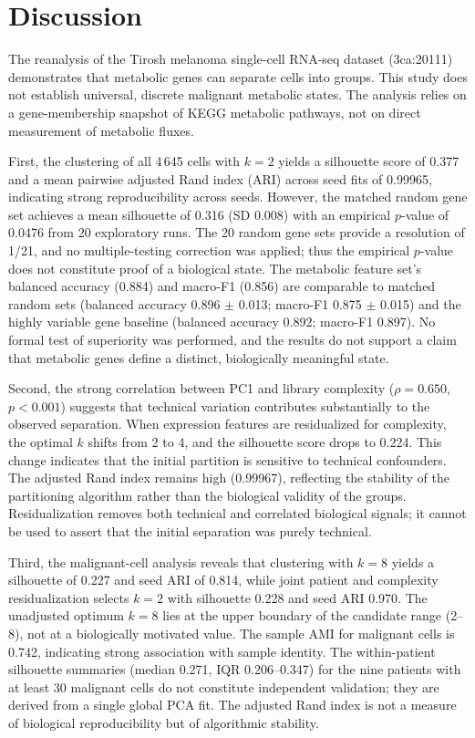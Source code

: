 \section{Discussion}

The reanalysis of the Tirosh melanoma single-cell RNA-seq dataset (3ca:20111) demonstrates that metabolic genes can separate cells into groups. This study does not establish universal, discrete malignant metabolic states. The analysis relies on a gene-membership snapshot of KEGG metabolic pathways, not on direct measurement of metabolic fluxes.

First, the clustering of all 4\,645 cells with $k=2$ yields a silhouette score of 0.377 and a mean pairwise adjusted Rand index (ARI) across seed fits of 0.99965, indicating strong reproducibility across seeds. However, the matched random gene set achieves a mean silhouette of 0.316 (SD 0.008) with an empirical $p$-value of 0.0476 from 20 exploratory runs. The 20 random gene sets provide a resolution of 1/21, and no multiple-testing correction was applied; thus the empirical $p$-value does not constitute proof of a biological state. The metabolic feature set's balanced accuracy (0.884) and macro-F1 (0.856) are comparable to matched random sets (balanced accuracy 0.896 $\pm$ 0.013; macro-F1 0.875 $\pm$ 0.015) and the highly variable gene baseline (balanced accuracy 0.892; macro-F1 0.897). No formal test of superiority was performed, and the results do not support a claim that metabolic genes define a distinct, biologically meaningful state.

Second, the strong correlation between PC1 and library complexity ($\rho = 0.650$, $p < 0.001$) suggests that technical variation contributes substantially to the observed separation. When expression features are residualized for complexity, the optimal $k$ shifts from 2 to 4, and the silhouette score drops to 0.224. This change indicates that the initial partition is sensitive to technical confounders. The adjusted Rand index remains high (0.99967), reflecting the stability of the partitioning algorithm rather than the biological validity of the groups. Residualization removes both technical and correlated biological signals; it cannot be used to assert that the initial separation was purely technical.

Third, the malignant-cell analysis reveals that clustering with $k=8$ yields a silhouette of 0.227 and seed ARI of 0.814, while joint patient and complexity residualization selects $k=2$ with silhouette 0.228 and seed ARI 0.970. The unadjusted optimum $k=8$ lies at the upper boundary of the candidate range (2--8), not at a biologically motivated value. The sample AMI for malignant cells is 0.742, indicating strong association with sample identity. The within-patient silhouette summaries (median 0.271, IQR 0.206--0.347) for the nine patients with at least 30 malignant cells do not constitute independent validation; they are derived from a single global PCA fit. The adjusted Rand index is not a measure of biological reproducibility but of algorithmic stability.

